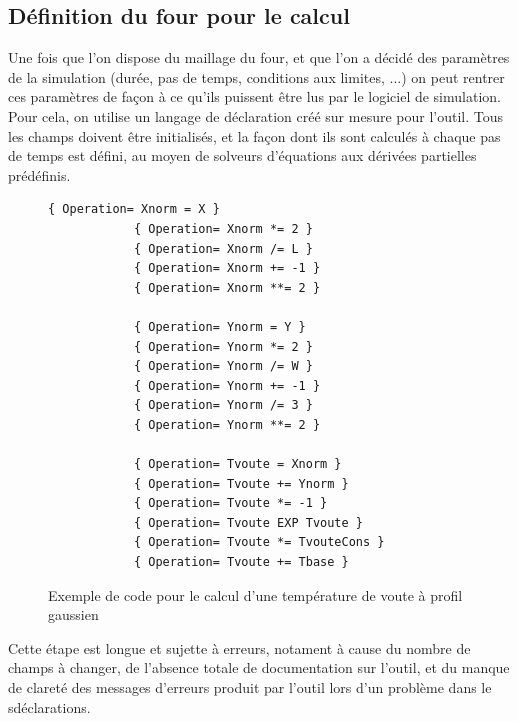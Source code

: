 \documentclass[12pt, a4paper, french, BCOR = 0pt, DIV = 10]{scrartcl}
\begin{document}
    \subsection{Définition du four pour le calcul}
    Une fois que l'on dispose du maillage du four, et que l'on a décidé des paramètres de la simulation (durée, pas de temps, conditions aux limites, ...) on peut rentrer ces paramètres de façon à ce qu'ils puissent être lus par le logiciel de simulation. Pour cela, on utilise un langage de déclaration créé sur mesure pour l'outil. Tous les champs doivent être initialisés, et la façon dont ils sont calculés à chaque pas de temps est défini, au moyen de solveurs d'équations aux dérivées partielles prédéfinis.\\
    \begin{figure}
        \caption{Exemple de code pour le calcul d'une température de voute à profil gaussien}
        \label{code.1}
        \begin{lstlisting}[frame=single]
            { Operation= Xnorm = X }
            { Operation= Xnorm *= 2 }
            { Operation= Xnorm /= L }
            { Operation= Xnorm += -1 }
            { Operation= Xnorm **= 2 }
          
            { Operation= Ynorm = Y }
            { Operation= Ynorm *= 2 }
            { Operation= Ynorm /= W }
            { Operation= Ynorm += -1 }
            { Operation= Ynorm /= 3 }
            { Operation= Ynorm **= 2 }
          
            { Operation= Tvoute = Xnorm }
            { Operation= Tvoute += Ynorm }
            { Operation= Tvoute *= -1 }
            { Operation= Tvoute EXP Tvoute }
            { Operation= Tvoute *= TvouteCons }
            { Operation= Tvoute += Tbase }
        \end{lstlisting}
    \end{figure}
    Cette étape est longue et sujette à erreurs, notament à cause du nombre de champs à changer, de l'absence totale de documentation sur l'outil, et du manque de clareté des messages d'erreurs produit par l'outil lors d'un problème dans le sdéclarations.
\end{document}

